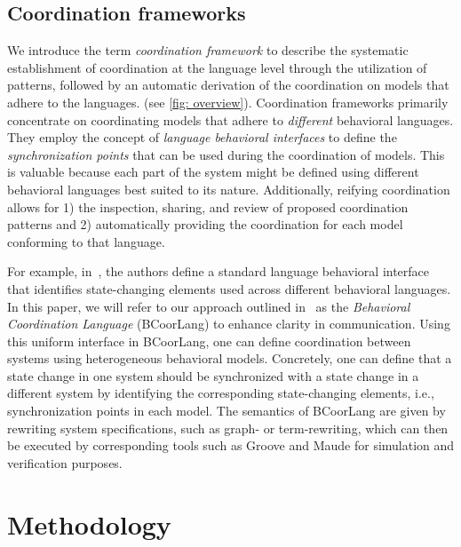 \documentclass[runningheads]{llncs}
\begin{document}
\subsection{Coordination frameworks} \label{subsec: frameworks}
We introduce the term \textit{coordination framework} to describe the systematic establishment of coordination at the language level through the utilization of patterns, followed by an automatic derivation of the coordination on models that adhere to the languages. (see \autoref{fig: overview}).
Coordination frameworks primarily concentrate on coordinating models that adhere to \textit{different} behavioral languages. They employ the concept of \textit{language behavioral interfaces} to define the \textit{synchronization points} that can be used during the coordination of models. 
This is valuable because each part of the system might be defined using different behavioral languages best suited to its nature.
Additionally, reifying coordination allows for 1) the inspection, sharing, and review of proposed coordination patterns and 2) automatically providing the coordination for each model conforming to that language.

For example, in~\cite{krauterBehavioralConsistencyMultimodeling2023}, the authors define a standard language behavioral interface that identifies state-changing elements used across different behavioral languages.
In this paper, we will refer to our approach outlined in~\cite{krauterBehavioralConsistencyMultimodeling2023} as the \textit{Behavioral Coordination Language} (BCoorLang) to enhance clarity in communication.
Using this uniform interface in BCoorLang, one can define coordination between systems using heterogeneous behavioral models.
Concretely, one can define that a state change in one system should be synchronized with a state change in a different system by identifying the corresponding state-changing elements, i.e., synchronization points in each model.
The semantics of BCoorLang are given by rewriting system specifications, such as graph- or term-rewriting, which can then be executed by corresponding tools such as Groove \cite{rensinkGROOVESimulatorTool2004} and Maude \cite{manuelclavelAllMaudeHighPerformance2007} for simulation and verification purposes.

\section{Methodology} \label{sec: methodology}
\end{document}

